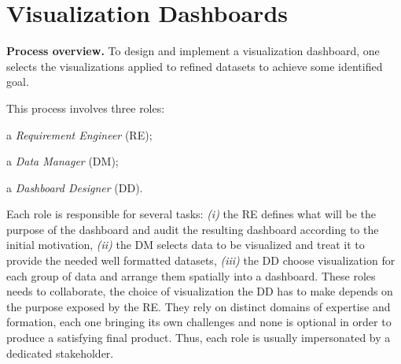 \documentclass{sigplanconf}
\begin{document}

\section{Visualization Dashboards}
\textbf{Process overview.}
To design and implement a visualization dashboard, one selects the
visualizations applied to refined datasets to achieve some identified
goal. 

This process involves three roles: \begin{myenumerate}
\item a \emph{Requirement Engineer} (RE);
\item a \emph{Data Manager} (DM);
\item a \emph{Dashboard Designer} (DD).
\end{myenumerate}
Each role is responsible for several tasks: \emph{(i)} the RE defines what
will be the purpose of the dashboard and audit the resulting dashboard
according to the initial motivation, \emph{(ii)} the DM selects data to be
visualized and treat it to provide the needed well formatted
datasets, \emph{(iii)} the DD choose visualization for each group of data and
arrange them spatially into a dashboard.
These roles needs to collaborate, \eg the choice of visualization the
DD has to make depends on the purpose exposed by the RE. They rely
on distinct domains of expertise and formation, each one bringing its
own challenges and none is optional in order to produce a satisfying
final product. Thus, each role is usually impersonated by a
dedicated stakeholder.  
\end{document}
